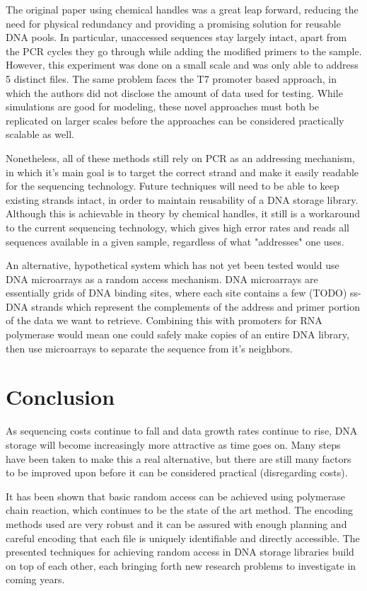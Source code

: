 \documentclass[a4paper,conference]{IEEEtran}
\begin{document}
The original paper using chemical handles was a great leap forward, reducing the need for physical redundancy and providing a promising solution for reusable DNA pools. In particular, unaccessed sequences stay largely intact, apart from the PCR cycles they go through while adding the modified primers to the sample. However, this experiment was done on a small scale and was only able to address 5 distinct files. The same problem faces the T7 promoter based approach, in which the authors did not disclose the amount of data used for testing. While simulations are good for modeling, these novel approaches must both be replicated on larger scales before the approaches can be considered practically scalable as well. 

Nonetheless, all of these methods still rely on PCR as an addressing mechanism, in which it's main goal is to target the correct strand and make it easily readable for the sequencing technology. Future techniques will need to be able to keep existing strands intact, in order to maintain reusability of a DNA storage library. Although this is achievable in theory by chemical handles, it still is a workaround to the current sequencing technology, which gives high error rates and reads all sequences available in a given sample, regardless of what "addresses" one uses. 

An alternative, hypothetical system which has not yet been tested would use DNA microarrays as a random access mechanism. DNA microarrays are essentially grids of DNA binding sites, where each site contains a few (TODO) ss-DNA strands which represent the complements of the address and primer portion of the data we want to retrieve. Combining this with promoters for RNA polymerase would mean one could safely make copies of an entire DNA library, then use microarrays to separate the sequence from it's neighbors. 

\section{Conclusion}
As sequencing costs continue to fall and data growth rates continue to rise, DNA storage will become increasingly more attractive as time goes on. Many steps have been taken to make this a real alternative, but there are still many factors to be improved upon before it can be considered practical (disregarding costs).

It has been shown that basic random access can be achieved using polymerase chain reaction, which continues to be the state of the art method. The encoding methods used are very robust and it can be assured with enough planning and careful encoding that each file is uniquely identifiable and directly accessible. The presented techniques for achieving random access in DNA storage libraries build on top of each other, each bringing forth new research problems to investigate in coming years.
\end{document}
